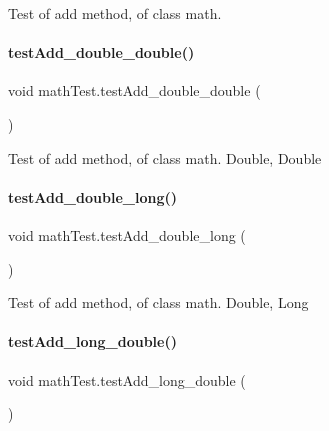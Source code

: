 Test of add method, of class math. \mbox{\label{classmathTest_a7b1a619e083f9a71b5a091cab2de3753}} 
\paragraph{\texorpdfstring{test\+Add\+\_\+double\+\_\+double()}{testAdd\_double\_double()}}
{\footnotesize\ttfamily void math\+Test.\+test\+Add\+\_\+double\+\_\+double (\begin{DoxyParamCaption}{ }\end{DoxyParamCaption})\hspace{0.3cm}{\ttfamily [inline]}}

Test of add method, of class math. Double, Double \mbox{\label{classmathTest_a72ca573e76fbe7f9b2020991147a29d1}} 
\paragraph{\texorpdfstring{test\+Add\+\_\+double\+\_\+long()}{testAdd\_double\_long()}}
{\footnotesize\ttfamily void math\+Test.\+test\+Add\+\_\+double\+\_\+long (\begin{DoxyParamCaption}{ }\end{DoxyParamCaption})\hspace{0.3cm}{\ttfamily [inline]}}

Test of add method, of class math. Double, Long \mbox{\label{classmathTest_adb101b785ac541dce91f6de05cf0ed51}} 
\paragraph{\texorpdfstring{test\+Add\+\_\+long\+\_\+double()}{testAdd\_long\_double()}}
{\footnotesize\ttfamily void math\+Test.\+test\+Add\+\_\+long\+\_\+double (\begin{DoxyParamCaption}{ }\end{DoxyParamCaption})\hspace{0.3cm}{\ttfamily [inline]}}

